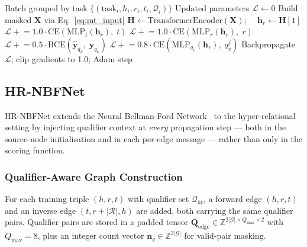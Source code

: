 \documentclass[10pt,journal,compsoc]{IEEEtran}
\begin{document}
\begin{algorithm}[t]
\caption{MT-AS Training Step}
\label{alg:mtas}
\begin{algorithmic}[1]
\Require Batch grouped by task
  $\{(\mathrm{task}_i, h_i, r_i, t_i, \mathcal{Q}_i)\}$
\Ensure Updated parameters
\State $\mathcal{L} \leftarrow 0$
  \State Build masked $\mathbf{X}$ via Eq.~\eqref{eq:mt_input}
  \State $\mathbf{H} \leftarrow
    \mathrm{TransformerEncoder}(\mathbf{X})$;
    $\quad \mathbf{h}_r \leftarrow \mathbf{H}[1]$
    \State $\mathcal{L} \mathrel{+}= 1.0 \cdot
      \mathrm{CE}(\mathrm{MLP}_t(\mathbf{h}_r),\; t)$
    \State $\mathcal{L} \mathrel{+}= 1.0 \cdot
      \mathrm{CE}(\mathrm{MLP}_r(\mathbf{h}_r),\; r)$
    \State $\mathcal{L} \mathrel{+}= 0.5 \cdot
      \mathrm{BCE}(\hat{\mathbf{y}}_{q_k},\;
      \mathbf{y}_{q_k})$
    \State $\mathcal{L} \mathrel{+}= 0.8 \cdot
      \mathrm{CE}(\mathrm{MLP}_{q_v}(\mathbf{h}_r),\; q_v^j)$
  \EndIf
\EndFor
\State Backpropagate $\mathcal{L}$;
  clip gradients to 1.0; Adam step
\end{algorithmic}
\end{algorithm}

\subsection{HR-NBFNet}
\label{ssec:hrnbfnet}

HR-NBFNet extends the Neural Bellman-Ford
Network~\cite{zhu2021neural} to the hyper-relational setting
by injecting qualifier context at \emph{every} propagation
step — both in the source-node initialisation and in each
per-edge message — rather than only in the scoring function.

\subsubsection{Qualifier-Aware Graph Construction}
For each training triple $(h, r, t)$ with qualifier set
$\mathcal{Q}_{ht}$, a forward edge $(h, r, t)$ and an
inverse edge $(t, r{+}|\mathcal{R}|, h)$ are added, both
carrying the same qualifier pairs.
Qualifier pairs are stored in a padded tensor
$\mathbf{Q}_{\mathrm{edge}}
\in \mathbb{Z}^{2|\mathcal{G}| \times Q_{\max} \times 2}$
with $Q_{\max}{=}8$, plus an integer count vector
$\mathbf{n}_q \in \mathbb{Z}^{2|\mathcal{G}|}$
for valid-pair masking.
\end{document}
